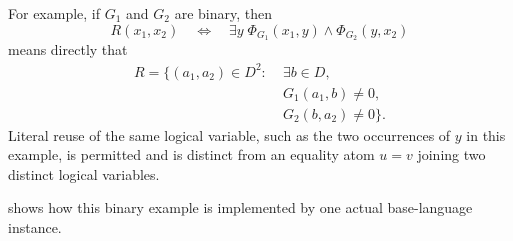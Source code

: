 \documentclass[11pt]{article}
\theoremstyle{plain}
\theoremstyle{definition}
\theoremstyle{remark}
\newcommand{\SuppRel}[1]{\Phi_{#1}}
\begin{document}
For example, if $G_1$ and $G_2$ are binary, then
\[
  R(x_1,x_2)
  \quad\Longleftrightarrow\quad
  \exists y\;
  \SuppRel{G_1}(x_1,y)\wedge\SuppRel{G_2}(y,x_2)
\]
means directly that
\[
\begin{aligned}
  R=\{(a_1,a_2)\in D^2:\;&\exists b\in D,\\
       &G_1(a_1,b)\ne0,\\[-2pt]
       &G_2(b,a_2)\ne0\}.
\end{aligned}
\]
Literal reuse of the same logical variable, such as the two occurrences of
$y$ in this example, is permitted and is distinct from an equality atom
$u=v$ joining two distinct logical variables.

 shows how this binary example
is implemented by one actual base-language instance.
\end{document}
